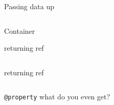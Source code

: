 \documentclass[aspectratio=169,notes]{beamer}
\begin{document}
	\begin{frame}[fragile]{Passing data up}
		\begin{columns}[T]
		\begin{column}{0.49\textwidth}
		
		\end{column}
		\pause
		\begin{column}{0.49\textwidth}
		
		\end{column}
		\end{columns}
	\end{frame}

	\begin{frame}[fragile]{Container}
		
	\end{frame}

	\begin{frame}[fragile]{returning ref}
		\begin{columns}[T]
		\begin{column}{0.49\textwidth}
		
		\end{column}
		\pause
		\begin{column}{0.49\textwidth}
		
		\end{column}
		\end{columns}
	\end{frame}

	\begin{frame}[fragile]{returning ref}
		\begin{columns}[T]
		\begin{column}{0.49\textwidth}
		
		\end{column}
		\pause
		\begin{column}{0.49\textwidth}
		
		\end{column}
		\end{columns}
	\end{frame}

	\begin{frame}[fragile]{\lstinline|@property| what do you even get?}
		
	\end{frame}
\end{document}
